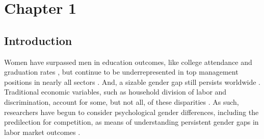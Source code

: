 \documentclass[a4paper, nobind]{templates/ociamthesis}
\begin{document}
\begin{romanpages}
\listoffigures
	\mtcaddchapter

\listoftables
  \mtcaddchapter

\end{romanpages}

\flushbottom

\hypertarget{chapter-1}{%
\chapter{Chapter 1}\label{chapter-1}}

\hypertarget{introduction}{%
\section{Introduction}\label{introduction}}

Women have surpassed men in education outcomes, like college attendance and graduation rates \autocite{Blau2017,Goldin2006,Stoet2014}, but continue to be underrepresented in top management positions in nearly all sectors \autocite{Bertrand2001}. And, a sizable gender gap still persists worldwide \autocite{Blau2017}. Traditional economic variables, such as household division of labor and discrimination, account for some, but not all, of these disparities \autocite{Blau2017}. As such, researchers have begun to consider psychological gender differences, including the predilection for competition, as means of understanding persistent gender gaps in labor market outcomes \autocite[for review, see][]{Niederle2011}.
\end{document}
